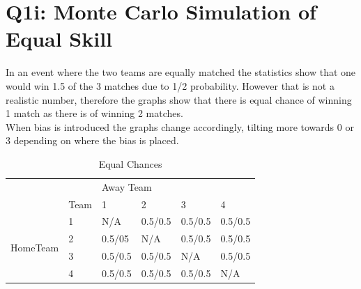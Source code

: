 \documentclass[12pt]{article}
\begin{document}
\tableofcontents
{}
\thispagestyle{empty}
\cleardoublepage
\setcounter{page}{1}
\pagebreak

\section{Q1i: Monte Carlo Simulation of Equal Skill}

In an event where the two teams are equally matched the statistics show that one would win 1.5 of the 3 matches due to 1/2 probability. However that is not a realistic number, therefore the graphs show that there is equal chance of winning 1 match as there is of winning 2 matches. \\
When bias is introduced the graphs change accordingly, tilting more towards 0 or 3 depending on where the bias is placed.\\

\begin{table}[H]
\centering
\caption{Equal Chances}
\label{my-label}
\begin{tabular}{ll|l|l|l|l|}
\cline{3-6}
                                                &      & \multicolumn{4}{l|}{Away Team}    \\ \cline{2-6} 
\multicolumn{1}{l|}{}                           & Team & 1      & 2      & 3      & 4      \\ \hline
\multicolumn{1}{|l|}{\multirow{4}{*}{HomeTeam}} & 1    & N/A    & 0.5/0.5 & 0.5/0.5 & 0.5/0.5 \\ \cline{2-6} 
\multicolumn{1}{|l|}{}                          & 2    & 0.5/05 & N/A    & 0.5/0.5 & 0.5/0.5 \\ \cline{2-6} 
\multicolumn{1}{|l|}{}                          & 3    & 0.5/0.5 & 0.5/0.5 & N/A    & 0.5/0.5 \\ \cline{2-6} 
\multicolumn{1}{|l|}{}                          & 4    & 0.5/0.5 & 0.5/0.5 & 0.5/0.5 & N/A    \\ \hline
\end{tabular}
\end{table}
\end{document}
